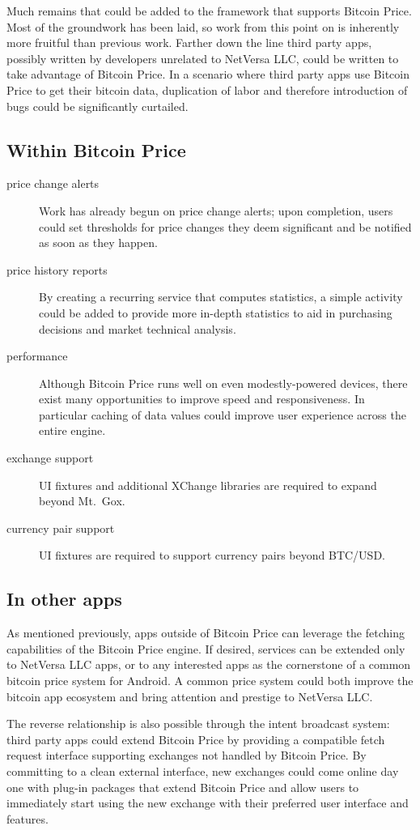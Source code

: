 \documentclass[twocolumn]{article}
\newcommand{\org}{NetVersa LLC\xspace}
\newcommand{\app}{Bitcoin Price\xspace}
\newcommand{\platform}{Android\xspace}
\newcommand{\onlyexch}{Mt.~Gox\xspace}
\begin{document}
    Much remains that could be added to the framework that supports \app.  Most
    of the groundwork has been laid, so work from this point on is inherently
    more fruitful than previous work.
    Farther down the line third party apps, possibly written by developers
    unrelated to \org, could be written to take advantage of \app.  In a
    scenario where third party apps use \app to get their bitcoin data,
    duplication of labor and therefore introduction of bugs could be
    significantly curtailed.

    \subsection*{Within \app}

    \begin{description}
        \item[price change alerts]
            Work has already begun on price change alerts; upon completion,
            users could set thresholds for price changes they deem significant
            and be notified as soon as they happen.
        \item[price history reports]
            By creating a recurring service that computes statistics, a simple
            activity could be added to provide more in-depth statistics to aid
            in purchasing decisions and market technical analysis.
        \item[performance]
            Although \app runs well on even modestly-powered devices, there
            exist many opportunities to improve speed and responsiveness.  In
            particular caching of data values could improve user experience
            across the entire engine.
        \item[exchange support]
            UI fixtures and additional XChange libraries are required to expand beyond \onlyexch.
        \item[currency pair support]
            UI fixtures are required to support currency pairs beyond BTC/USD.
    \end{description}

    \subsection*{In other apps}

    As mentioned previously, apps outside of \app can leverage the fetching
    capabilities of the \app engine.  If desired, services can be extended only
    to \org apps, or to any interested apps as the cornerstone of a common
    bitcoin price system for \platform.  A common price system could both
    improve the bitcoin app ecosystem and bring attention and prestige to \org.

    The reverse relationship is also possible through the intent broadcast
    system: third party apps could extend \app by providing a compatible fetch
    request interface supporting exchanges not handled by \app.  By committing
    to a clean external interface, new exchanges could come online day one with
    plug-in packages that extend \app and allow users to immediately start
    using the new exchange with their preferred user interface and features.
\end{document}
